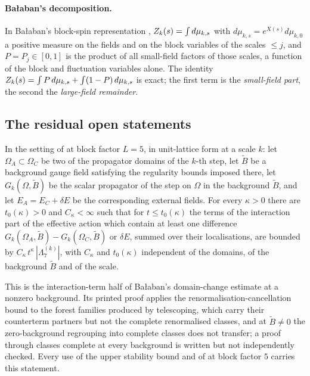 \paragraph{Ba{\l}aban's decomposition.} In Ba{\l}aban's block-spin representation \cite{Ba1,Ba2}, $Z_{k}(s)=\int d\mu_{k,s}$ with $d\mu_{k,s}=e^{X(s)}d\mu_{k,0}$ a positive measure on the fields and on the block variables of the scales $\le j$, and $P=P_j\in[0,1]$ is the product of all small-field factors of those scales, a function of the block and fluctuation variables alone. The identity $Z_{k}(s)=\int P\,d\mu_{k,s}+\int(1-P)\,d\mu_{k,s}$ is exact; the first term is the \emph{small-field part}, the second the \emph{large-field remainder}.

\subsection{The residual open statements}\label{ssec:k01:open}

\begin{hypothesis}\label{hyp:k01:BALint}
In the setting of \cite[Sect.~2 and Prop.~2.6]{Ba2} at block factor $L=5$, in unit-lattice form at a scale $k$: let $\Omega_A\subset\Omega_C$ be two of the propagator domains of the $k$-th step, let $\tilde B$ be a background gauge field satisfying the regularity bounds imposed there, let $G_k(\Omega,\tilde B)$ be the scalar propagator of the step on $\Omega$ in the background $\tilde B$, and let $E_A=E_C+\delta E$ be the corresponding external fields. For every $\kappa>0$ there are $t_0(\kappa)>0$ and $C_\kappa<\infty$ such that for $t\le t_0(\kappa)$ the terms of the interaction part of the effective action which contain at least one difference $G_k(\Omega_A,\tilde B)-G_k(\Omega_C,\tilde B)$ or $\delta E$, summed over their localisations, are bounded by $C_\kappa\,t^{\kappa}\,|\Lambda^{(k)}_7|$, with $C_\kappa$ and $t_0(\kappa)$ independent of the domains, of the background $\tilde B$ and of the scale.
\end{hypothesis}
This is the interaction-term half of Ba{\l}aban's domain-change estimate \cite[Prop.~2.6, (5.8)]{Ba2} at a nonzero background. Its printed proof applies the renormalisation-cancellation bound to the forest families produced by telescoping, which carry their counterterm partners but not the complete renormalised classes, and at $\tilde B\ne0$ the zero-background regrouping into complete classes does not transfer; a proof through classes complete at every background is written but not independently checked. Every use of the upper stability bound \cite[(1.3)]{Ba2} and of \cite[Thm.~3.1, (3.4)]{K1} at block factor $5$ carries this statement.

